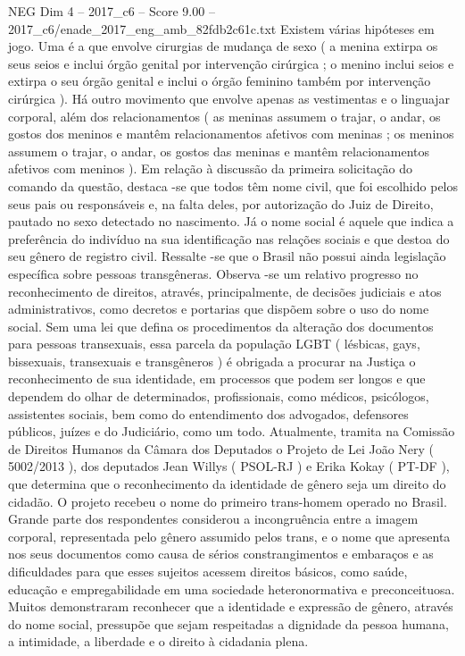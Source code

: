 \begin{textsample}{NEG Dim 4 – 2017\_c6 – Score 9.00 – 2017\_c6/enade\_2017\_eng\_amb\_82fdb2c61c.txt}
Existem várias hipóteses em jogo.
Uma é a que envolve cirurgias de mudança de sexo ( a menina extirpa os seus seios e inclui órgão genital por intervenção cirúrgica ; o menino inclui seios e extirpa o seu órgão genital e inclui o órgão feminino também por intervenção cirúrgica ).
Há outro movimento que envolve apenas as vestimentas e o linguajar corporal, além dos relacionamentos ( as meninas assumem o trajar, o andar, os gostos dos meninos e mantêm relacionamentos afetivos com meninas ; os meninos assumem o trajar, o andar, os gostos das meninas e mantêm relacionamentos afetivos com meninos ).
Em relação à discussão da primeira solicitação do comando da questão, destaca -se que todos têm nome civil, que foi escolhido pelos seus pais ou responsáveis e, na falta deles, por autorização do Juiz de Direito, pautado no sexo detectado no nascimento.
Já o nome social é aquele que indica a preferência do indivíduo na sua identificação nas relações sociais e que destoa do seu gênero de registro civil.
Ressalte -se que o Brasil não possui ainda legislação específica sobre pessoas transgêneras.
Observa -se um relativo progresso no reconhecimento de direitos, através, principalmente, de decisões judiciais e atos administrativos, como decretos e portarias que dispõem sobre o uso do nome social.
Sem uma lei que defina os procedimentos da alteração dos documentos para pessoas transexuais, essa parcela da população LGBT ( lésbicas, gays, bissexuais, transexuais e transgêneros ) é obrigada a procurar na Justiça o reconhecimento de sua identidade, em processos que podem ser longos e que dependem do olhar de determinados, profissionais, como médicos, psicólogos, assistentes sociais, bem como do entendimento dos advogados, defensores públicos, juízes e do Judiciário, como um todo.
Atualmente, tramita na Comissão de Direitos Humanos da Câmara dos Deputados o Projeto de Lei João Nery ( 5002/2013 ), dos deputados Jean Willys ( PSOL-RJ ) e Erika Kokay ( PT-DF ), que determina que o reconhecimento da identidade de gênero seja um direito do cidadão.
O projeto recebeu o nome do primeiro trans-homem operado no Brasil.
Grande parte dos respondentes considerou a incongruência entre a imagem corporal, representada pelo gênero assumido pelos trans, e o nome que apresenta nos seus documentos como causa de sérios constrangimentos e embaraços e as dificuldades para que esses sujeitos acessem direitos básicos, como saúde, educação e empregabilidade em uma sociedade heteronormativa e preconceituosa.
Muitos demonstraram reconhecer que a identidade e expressão de gênero, através do nome social, pressupõe que sejam respeitadas a dignidade da pessoa humana, a intimidade, a liberdade e o direito à cidadania plena.

\end{textsample}
